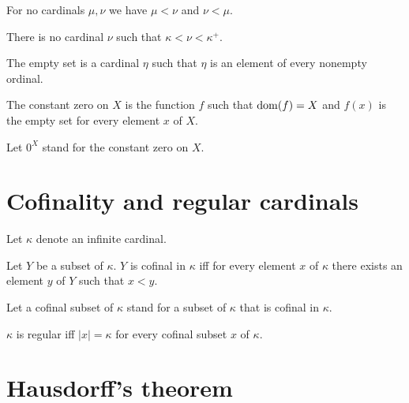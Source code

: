 \documentclass[english]{article}
\begin{document}
\begin{forthel}
    \begin{axiom}
      For no cardinals $\mu, \nu$ we have $\mu < \nu$ and $\nu < \mu$.
    \end{axiom}

    \begin{axiom}
      There is no cardinal $\nu$ such that $\kappa < \nu < \kappa^{+}$.
    \end{axiom}

    \begin{axiom}
      The empty set is a cardinal $\eta$ such that $\eta$ is an element of
      every nonempty ordinal.
    \end{axiom}

    \begin{definition}
      The constant zero on $X$ is the function $f$ such that $\operatorname{dom}(f) = X$ and
      $f(x)$ is the empty set for every element $x$ of $X$.
    \end{definition}

    Let $0^{X}$ stand for the constant zero on $X$.
  \end{forthel}


  \section{Cofinality and regular cardinals}

  \begin{forthel}
    Let $\kappa$ denote an infinite cardinal.

    \begin{definition}[Cofinality]\label{Cofinality}
      Let $Y$ be a subset of $\kappa$.
      $Y$ is cofinal in $\kappa$ iff for every element $x$ of $\kappa$ there
      exists an element $y$ of $Y$ such that $x < y$.
    \end{definition}

    Let a cofinal subset of $\kappa$ stand for a subset of $\kappa$ that is
    cofinal in $\kappa$.

    \begin{definition}
      $\kappa$ is regular iff $|x| = \kappa$ for every cofinal subset $x$ of
      $\kappa$.
    \end{definition}
  \end{forthel}


  \section{Hausdorff's theorem}
\end{document}
